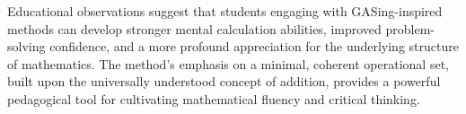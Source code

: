 Educational observations suggest that students engaging with GASing-inspired methods can develop stronger mental calculation abilities, improved problem-solving confidence, and a more profound appreciation for the underlying structure of mathematics. The method's emphasis on a minimal, coherent operational set, built upon the universally understood concept of addition, provides a powerful pedagogical tool for cultivating mathematical fluency and critical thinking.
